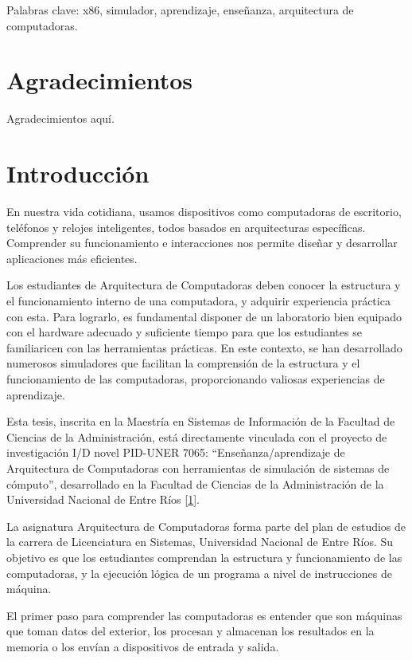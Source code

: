 \documentclass[12pt,twoside]{templates/unerthesis}
\begin{document}
Palabras clave: x86, simulador, aprendizaje, enseñanza, arquitectura de computadoras.

\hypertarget{agradecimientos}{%
\chapter*{Agradecimientos}\label{agradecimientos}}

Agradecimientos aquí.

\hypertarget{introducciuxf3n}{%
\chapter{Introducción}\label{introducciuxf3n}}

En nuestra vida cotidiana, usamos dispositivos como computadoras de escritorio, teléfonos y relojes inteligentes, todos basados en arquitecturas específicas. Comprender su funcionamiento e interacciones nos permite diseñar y desarrollar aplicaciones más eficientes.

Los estudiantes de Arquitectura de Computadoras deben conocer la estructura y el funcionamiento interno de una computadora, y adquirir experiencia práctica con esta. Para lograrlo, es fundamental disponer de un laboratorio bien equipado con el hardware adecuado y suficiente tiempo para que los estudiantes se familiaricen con las herramientas prácticas. En este contexto, se han desarrollado numerosos simuladores que facilitan la comprensión de la estructura y el funcionamiento de las computadoras, proporcionando valiosas experiencias de aprendizaje.

Esta tesis, inscrita en la Maestría en Sistemas de Información de la Facultad de Ciencias de la Administración, está directamente vinculada con el proyecto de investigación I/D novel PID-UNER 7065: ``Enseñanza/aprendizaje de Arquitectura de Computadoras con herramientas de simulación de sistemas de cómputo'', desarrollado en la Facultad de Ciencias de la Administración de la Universidad Nacional de Entre Ríos {[}\protect\hyperlink{ref-colombani_pid_2022}{1}{]}.

La asignatura Arquitectura de Computadoras forma parte del plan de estudios de la carrera de Licenciatura en Sistemas, Universidad Nacional de Entre Ríos. Su objetivo es que los estudiantes comprendan la estructura y funcionamiento de las computadoras, y la ejecución lógica de un programa a nivel de instrucciones de máquina.

El primer paso para comprender las computadoras es entender que son máquinas que toman datos del exterior, los procesan y almacenan los resultados en la memoria o los envían a dispositivos de entrada y salida.
\end{document}
